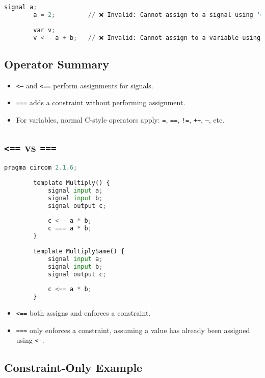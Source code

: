 \documentclass{article}
\begin{document}
	\begin{lstlisting}[language=python, caption={Invalid Signal and Variable Assignments}]
		signal a;
		a = 2;         // ❌ Invalid: Cannot assign to a signal using '='
		
		var v;
		v <-- a + b;   // ❌ Invalid: Cannot assign to a variable using '<--'
	\end{lstlisting}
	
	\subsection*{Operator Summary}
	
	\begin{itemize}
		\item \texttt{<--} and \texttt{<==} perform assignments for signals.
		\item \texttt{===} adds a constraint without performing assignment.
		\item For variables, normal C-style operators apply: \texttt{=}, \texttt{==}, \texttt{!=}, \texttt{++}, \texttt{--}, etc.
	\end{itemize}
	
	\subsection*{\texttt{<==} vs \texttt{===}}
	
	\begin{lstlisting}[language=python, caption={Semantically Equivalent Circuits}]
		pragma circom 2.1.6;
		
		template Multiply() {
			signal input a;
			signal input b;
			signal output c;
			
			c <-- a * b;
			c === a * b;
		}
		
		template MultiplySame() {
			signal input a;
			signal input b;
			signal output c;
			
			c <== a * b;
		}
	\end{lstlisting}
	
	\begin{itemize}
		\item \texttt{<==} both assigns and enforces a constraint.
		\item \texttt{===} only enforces a constraint, assuming a value has already been assigned using \texttt{<--}.
	\end{itemize}
	
	\subsection*{Constraint-Only Example}
	
\end{document}
